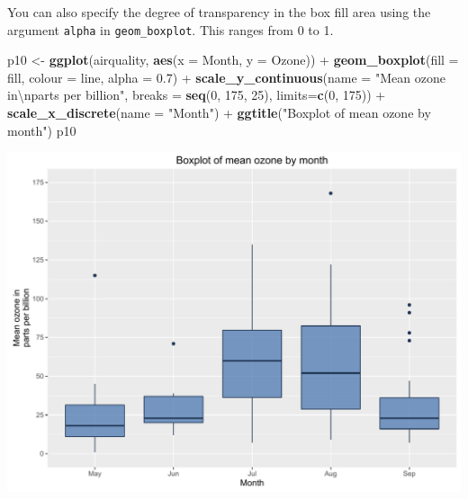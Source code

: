 \documentclass[]{article}
\newenvironment{Shaded}{\begin{snugshade}}{\end{snugshade}}
\newcommand{\KeywordTok}[1]{\textcolor[rgb]{0.13,0.29,0.53}{\textbf{{#1}}}}
\newcommand{\DataTypeTok}[1]{\textcolor[rgb]{0.13,0.29,0.53}{{#1}}}
\newcommand{\DecValTok}[1]{\textcolor[rgb]{0.00,0.00,0.81}{{#1}}}
\newcommand{\FloatTok}[1]{\textcolor[rgb]{0.00,0.00,0.81}{{#1}}}
\newcommand{\CharTok}[1]{\textcolor[rgb]{0.31,0.60,0.02}{{#1}}}
\newcommand{\StringTok}[1]{\textcolor[rgb]{0.31,0.60,0.02}{{#1}}}
\newcommand{\NormalTok}[1]{{#1}}
\begin{document}
You can also specify the degree of transparency in the box fill area
using the argument \texttt{alpha} in \texttt{geom\_boxplot}. This ranges
from 0 to 1.

\begin{Shaded}
\begin{Highlighting}[]
\NormalTok{p10 <-}\StringTok{ }\KeywordTok{ggplot}\NormalTok{(airquality, }\KeywordTok{aes}\NormalTok{(}\DataTypeTok{x =} \NormalTok{Month, }\DataTypeTok{y =} \NormalTok{Ozone)) +}\StringTok{ }
\StringTok{        }\KeywordTok{geom_boxplot}\NormalTok{(}\DataTypeTok{fill =} \NormalTok{fill, }\DataTypeTok{colour =} \NormalTok{line,}
                     \DataTypeTok{alpha =} \FloatTok{0.7}\NormalTok{) +}
\StringTok{        }\KeywordTok{scale_y_continuous}\NormalTok{(}\DataTypeTok{name =} \StringTok{"Mean ozone in}\CharTok{\textbackslash{}n}\StringTok{parts per billion"}\NormalTok{,}
                           \DataTypeTok{breaks =} \KeywordTok{seq}\NormalTok{(}\DecValTok{0}\NormalTok{, }\DecValTok{175}\NormalTok{, }\DecValTok{25}\NormalTok{),}
                           \DataTypeTok{limits=}\KeywordTok{c}\NormalTok{(}\DecValTok{0}\NormalTok{, }\DecValTok{175}\NormalTok{)) +}
\StringTok{        }\KeywordTok{scale_x_discrete}\NormalTok{(}\DataTypeTok{name =} \StringTok{"Month"}\NormalTok{) +}
\StringTok{        }\KeywordTok{ggtitle}\NormalTok{(}\StringTok{"Boxplot of mean ozone by month"}\NormalTok{)}
\NormalTok{p10}
\end{Highlighting}
\end{Shaded}

\begin{center}\includegraphics{0_all_posts_pdf/box_8-1} \end{center}
\end{document}
